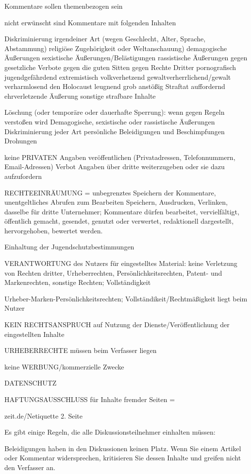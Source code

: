 Kommentare sollen themenbezogen sein

nicht erwünscht sind Kommentare mit folgenden Inhalten

Diskriminierung irgendeiner Art (wegen Geschlecht, Alter, Sprache, Abstammung) religiöse Zugehörigkeit oder Weltanschauung)
demagogische Äußerungen
sexistische Äußerungen/Belästigungen
rassistische Äußerungen 
gegen gesetzliche Verbote
gegen die guten Sitten 
gegen Rechte Dritter
pornografisch
jugendgefährdend
extremistisch
volkverhetzend
gewaltverherrlichend/gewalt verharmlosend
den Holocaust leugnend
grob anstößig
Straftat auffordernd 
ehrverletzende Äußerung
sonstige strafbare Inhalte


Löschung (oder temporäre oder dauerhafte Sperrung): wenn gegen Regeln verstoßen wird
Demagogische, sexistische oder rassistische Äußerungen
Diskriminierung jeder Art
persönliche Beleidigungen und Beschimpfungen
Drohungen

keine PRIVATEN Angaben veröffentlichen (Privatadressen, Telefonnummern, Email-Adressen)
Verbot Angaben über dritte weiterzugeben oder sie dazu aufzufordern

RECHTEEINRÄUMUNG =
unbegrenztes Speichern der Kommentare, unentgeltliches Abrufen zum Bearbeiten Speichern, Ausdrucken, Verlinken, dasselbe für dritte Unternehmer; Kommentare dürfen bearbeitet, vervielfältigt, öffentlich gemacht, gesendet, genutzt oder verwertet, redaktionell dargestellt, hervorgehoben, bewertet werden.


Einhaltung der Jugendschutzbestimmungen

VERANTWORTUNG des Nutzers für eingestelltes Material: 
keine Verletzung von Rechten dritter, Urheberrechten, Persönlichkeitsrechten, Patent- und Markenrechten, sonstige Rechten; Vollständigkeit

Urheber-Marken-Persönlichkeitsrechten; Vollständikeit/Rechtmäßigkeit liegt beim Nutzer

KEIN RECHTSANSPRUCH auf Nutzung der Dienste/Veröffentlichung der eingestellten Inhalte

URHEBERRECHTE müssen beim Verfasser liegen

keine WERBUNG/kommerzielle Zwecke

DATENSCHUTZ

HAFTUNGSAUSSCHLUSS für Inhalte fremder Seiten =


zeit.de/Netiquette 2. Seite

Es gibt einige Regeln, die alle Diskussionsteilnehmer einhalten müssen:
 
 Beleidigungen haben in den Diskussionen keinen Platz. Wenn Sie einem Artikel oder Kommentar widersprechen, kritisieren Sie dessen Inhalte und greifen nicht den Verfasser an.

